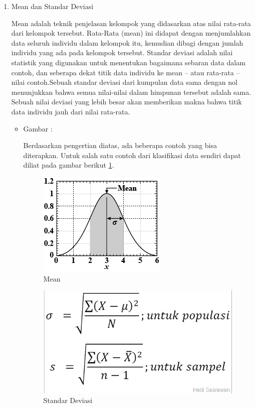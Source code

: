 \begin{enumerate}
\item Mean dan Standar Deviasi
\par Mean adalah teknik penjelasan kelompok yang didasarkan atas nilai rata-rata dari kelompok tersebut. Rata-Rata (mean) ini didapat dengan menjumlahkan data seluruh individu dalam kelompok itu, kemudian dibagi dengan jumlah individu yang ada pada kelompok tersebut. Standar deviasi adalah nilai statistik yang digunakan untuk menentukan bagaimana sebaran data dalam contoh, dan seberapa dekat titik data individu ke mean – atau rata-rata – nilai contoh.Sebuah standar deviasi dari kumpulan data sama dengan nol menunjukkan bahwa semua nilai-nilai dalam himpunan tersebut adalah sama. Sebuah nilai deviasi yang lebih besar akan memberikan makna bahwa titik data individu jauh dari nilai rata-rata.
\par
\begin{itemize}
\item Gambar :
\par Berdasarkan pengertian diatas, ada beberapa contoh yang bisa diterapkan. Untuk salah satu contoh dari klasifikasi data sendiri dapat diliat pada gambar berikut \ref{5_4}.
\begin{figure}[!hbtp]
\centering
\includegraphics[scale=0.5]{figures/zulfikar/5/5_3.png}
\caption{Mean }
\label{5_4}
\end{figure}
\begin{figure}[!hbtp]
\centering
\includegraphics[scale=0.5]{figures/zulfikar/5/5_4.png}
\caption{Standar Deviasi}
\label{5_5}
\end{figure}
\par
\end{itemize}


\end{enumerate}
